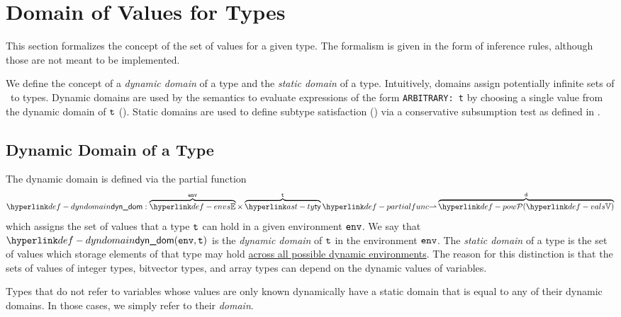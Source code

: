 \section{Domain of Values for Types\label{sec:DomainOfValuesForTypes}}
This section formalizes the concept of the set of values for a given type.
The formalism is given in the form of inference rules, although those are not meant
to be implemented.

We define the concept of a \emph{dynamic domain} of a type
and the \emph{static domain} of a type.
Intuitively, domains assign potentially infinite sets of \nativevalues\ to types.
Dynamic domains are used by the semantics to evaluate expressions of the form \texttt{ARBITRARY: t}
by choosing a single value from the dynamic domain of $\texttt{t}$ ().
Static domains are used to define subtype satisfaction ()
via a conservative subsumption test as defined in .

\subsection{Dynamic Domain of a Type\label{sec:DynDomain}}
\hypertarget{def-dyndomain}{}
The dynamic domain is defined via the partial function
\[
  \dynamicdomain : \overname{\envs}{\env} \times \overname{\ty}{\vt}
  \partialto \overname{\pow{\vals}}{\vd}
\]
which assigns the set of values that a type $\texttt{t}$ can hold in a given environment $\texttt{env}$.
%
We say that $\dynamicdomain(\env, \vt)$ is the \emph{dynamic domain} of $\texttt{t}$
in the environment $\texttt{env}$.
%
The \emph{static domain} of a type is the set of values which storage elements of that type may hold
\underline{across all possible dynamic environments}.
%
The reason for this distinction is that the sets of values
of integer types, bitvector types, and array types can depend on the dynamic values of variables.

Types that do not refer to variables whose values are only known dynamically have
a static domain that is equal to any of their dynamic domains.
In those cases, we simply refer to their \emph{domain}.

